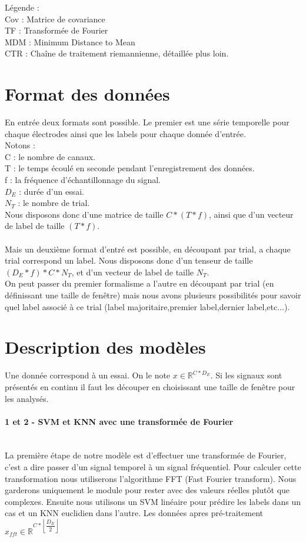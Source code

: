 \documentclass{article}[12pt]
\begin{document}
Légende :\\
Cov : Matrice de covariance\\
TF : Transformée de Fourier\\
MDM : Minimum Distance to Mean\\
CTR : Chaîne de traitement riemannienne, détaillée plus loin.
\\

\section{Format des données}
En entrée deux formats sont possible. Le premier est une série temporelle pour chaque électrodes ainsi que les labels pour chaque donnée d'entrée.\\
Notons :\\
C : le nombre de canaux.\\
T : le temps écoulé en seconde pendant l'enregistrement des données.\\
f : la fréquence d’échantillonnage du signal.\\
$D_{E}$ : durée d'un essai.\\
$N_{T}$ : le nombre de trial.\\
Nous disposons donc d'une matrice de taille $C*(T*f)$, ainsi que d'un vecteur de label de taille $(T*f)$.\\
\\
Mais un deuxième format d'entré est possible, en découpant par trial, a chaque trial correspond un label. Nous disposons donc d'un tenseur de taille $(D_{E}*f)*C*N_{T}$, et d'un vecteur de label de taille $N_{T}$.\\
On peut passer du premier formalisme a l'autre en découpant par trial (en définissant une taille de fenêtre) mais nous avons plusieurs possibilités pour savoir quel label associé à ce trial (label majoritaire,premier label,dernier label,etc...).\\
\section{Description des modèles}
Une donnée correspond à un essai. On le note $x\in \mathbb{R}^{C*D_{E}}$. Si les signaux sont présentés en continu il faut les découper en choisissant une taille de fenêtre pour les analysés.
\paragraph{1 et 2 - SVM et KNN avec une transformée de Fourier}\mbox{}\\
La première étape de notre modèle est d'effectuer une transformée de Fourier, c'est a dire passer d'un signal temporel à un signal fréquentiel. Pour calculer cette transformation nous utiliserons l'algorithme FFT (Fast Fourier transform). Nous garderons uniquement le module pour rester avec des valeurs réelles plutôt que complexes. Ensuite nous utilisons un SVM linéaire pour prédire les labels dans un cas et un KNN euclidien dans l'autre. Les données apres pré-traitement $x_{fft}\in \mathbb{R}^{C*\left\lfloor\dfrac{D_{E}}{2}\right\rfloor}$
\end{document}
